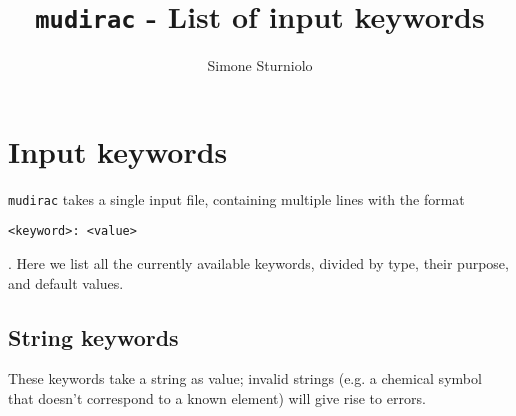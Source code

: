 \documentclass[]{article}
\title{\texttt{mudirac} - List of input keywords}
\author{Simone Sturniolo}
\begin{document}
\maketitle

\section{Input keywords}\label{APP:keyw}

\texttt{mudirac} takes a single input file, containing multiple lines with the format

\begin{verbatim}
<keyword>: <value>
\end{verbatim}

. Here we list all the currently available keywords, divided by type, their purpose, and default values.

\subsection{String keywords}

These keywords take a string as value; invalid strings (e.g. a chemical symbol that doesn't correspond to a known element) will give rise to errors.
\end{document}
